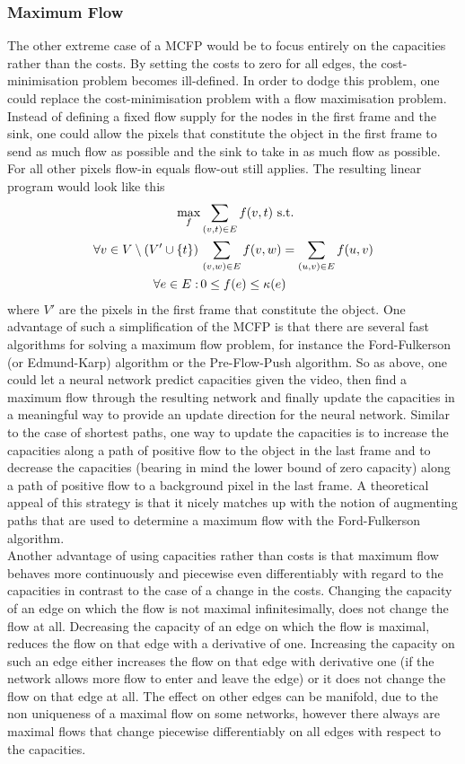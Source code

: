 \documentclass{article}
\begin{document}
{\subsubsection{Maximum Flow}
The other extreme case of a MCFP would be to focus entirely on the capacities rather than the costs. By setting the costs to zero for all edges, the cost-minimisation problem becomes ill-defined. In order to dodge this problem, one could replace the cost-minimisation problem with a flow maximisation problem. Instead of defining a fixed flow supply for the nodes in the first frame and the sink, one could allow the pixels that constitute the object in the first frame to send as much flow as possible and the sink to take in as much flow as possible. For all other pixels flow-in equals flow-out still applies. The resulting linear program would look like this 
\begin{align}\label{MFP}
\max_f &\sum_{(v,t) \in E} f(v,t) \textnormal{ s.t.}\nonumber\\
\forall v \in V\setminus\left(V' \cup \{ t\}\right) \, & \sum_{(v,w) \in E} f(v,w) = \sum_{(u,v) \in E} f(u,v) \\
\forall	e \in E: \, & 0 \leq f(e) \leq \kappa(e) \nonumber
\end{align} 
where $V'$ are the pixels in the first frame that constitute the object. One advantage of such a simplification of the MCFP is that there are several fast algorithms for solving a maximum flow problem, for instance the Ford-Fulkerson (or Edmund-Karp) algorithm or the Pre-Flow-Push algorithm. So as above, one could let a neural network predict capacities given the video, then find a maximum flow through the resulting network and finally update the capacities in a meaningful way to provide an update direction for the neural network. Similar to the case of shortest paths, one way to update the capacities is to increase the capacities along a path of positive flow to the object in the last frame and to decrease the capacities (bearing in mind the lower bound of zero capacity) along a path of positive flow to a background pixel in the last frame. A theoretical appeal of this strategy is that it nicely matches up with the notion of augmenting paths that are used to determine a maximum flow with the Ford-Fulkerson algorithm.\\
Another advantage of using capacities rather than costs is that maximum flow behaves more continuously and piecewise even differentiably with regard to the capacities in contrast to the case of a change in the costs. Changing the capacity of an edge on which the flow is not maximal infinitesimally, does not change the flow at all. Decreasing the capacity of an edge on which the flow is maximal, reduces the flow on that edge with a derivative of one. Increasing the capacity on such an edge either increases the flow on that edge with derivative one (if the network allows more flow to enter and leave the edge) or it does not change the flow on that edge at all. The effect on other edges can be manifold, due to the non uniqueness of a maximal flow on some networks, however there always are maximal flows that change piecewise differentiably on all edges with respect to the capacities. \\
}
\end{document}
